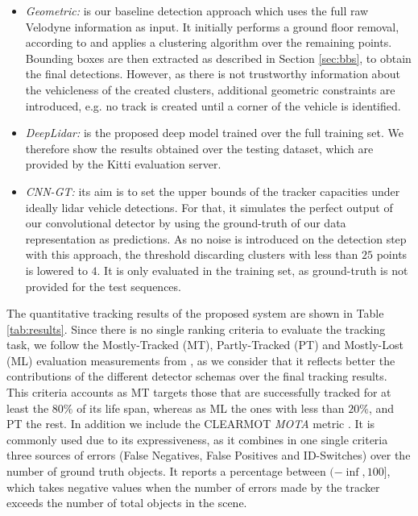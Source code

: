 \documentclass[letterpaper, 10 pt, conference]{ieeeconf}  %
\begin{document}
\begin{itemize}
\item \textit{Geometric:} is our baseline detection approach which uses the full raw Velodyne information as input. It initially performs a ground floor removal, according to \cite{petrovskaya2009model} and applies a clustering algorithm over the remaining points. Bounding boxes are then extracted as described in Section \ref{sec:bbs}, to obtain the final detections. However, as there is not trustworthy information about the vehicleness of the created clusters, additional geometric constraints are introduced, e.g. no track is created until a corner of the vehicle is identified.

\item \textit{DeepLidar:} is the proposed deep model trained over the full training set. We therefore show the results obtained over the testing dataset, which are provided by the Kitti evaluation server. 

\item \textit{CNN-GT:} its aim is to set the upper bounds of the tracker capacities under ideally lidar vehicle detections. For that, it simulates the perfect output of our convolutional detector by using the ground-truth of our data representation as predictions. As no noise is introduced on the detection step with this approach, the threshold discarding clusters with less than $25$ points is lowered to $4$. It is only evaluated in the training set, as ground-truth is not provided for the test sequences. 
\end{itemize}

The quantitative tracking results of the proposed system are shown in Table \ref{tab:results}. 
Since there is no single ranking criteria to evaluate the tracking task, we follow the Mostly-Tracked (MT), Partly-Tracked (PT) and Mostly-Lost (ML) evaluation measurements from \cite{li2009learning}, as we consider that it reflects better the contributions of the different detector schemas over the final tracking results. This criteria accounts as MT targets those that are successfully tracked for at least the $80\%$ of its life span, whereas as ML the ones with less than $20\%$, and PT the rest.
In addition we include the CLEARMOT \textit{MOTA} metric \cite{bernardin2008evaluating}. It is commonly used due to its expressiveness, as it combines in one single criteria three sources of errors (False Negatives, False Positives and ID-Switches) over the number of ground truth objects. It reports a percentage between $(-\inf,100]$, which takes negative values when the number of errors made by the tracker exceeds the number of total objects in the scene.
\end{document}
